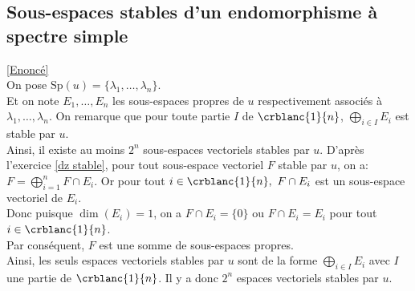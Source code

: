 \documentclass[8pt]{book}
\begin{document}
	
	\subsection{Sous-espaces stables d'un endomorphisme à spectre simple }
	\label{Sous-espaces stables d'un endomorphisme à spectre simple corrigé}
	\textcolor{blue}{\hyperref[Sous-espaces stables d'un endomorphisme à spectre simple]{[Enoncé]}}\\
	On pose $\text{Sp}(u)=\{\lambda_1,\dots,\lambda_n\}$.\\
	Et on note $E_1,\dots,E_n$ les sous-espaces propres de $u$ respectivement associés à $\lambda_1,\dots,\lambda_n$. 
	On remarque que pour toute partie $I$ de $\crblanc{1}{n}$, $\displaystyle\bigoplus_{i\in I}E_i$ est stable par $u$.
	\\Ainsi, il existe au moins $2^n$ sous-espaces vectoriels stables par $u$.
	D'après l'exercice \ref{dz stable}, pour tout sous-espace vectoriel $F$ stable par $u$, on a: $F=\displaystyle\bigoplus_{i=1}^n{F\cap E_i}$. Or pour tout $i\in \crblanc{1}{n},\ F\cap E_i$ est un sous-espace vectoriel de $E_i$.
	\\Donc puisque $\dim(E_i)=1$, on a $F\cap E_i=\{0\}$ ou $F\cap E_i=E_i$ pour tout $i\in \crblanc{1}{n}$.
	\\Par conséquent, $F$ est une somme de sous-espaces propres.
	\\Ainsi, les seuls espaces vectoriels stables par $u$ sont de la forme $\displaystyle\bigoplus_{i\in I}E_i$ avec $I$ une partie de $\crblanc{1}{n}$. Il y a donc $2^n$ espaces vectoriels stables par $u$.
	
\end{document}
